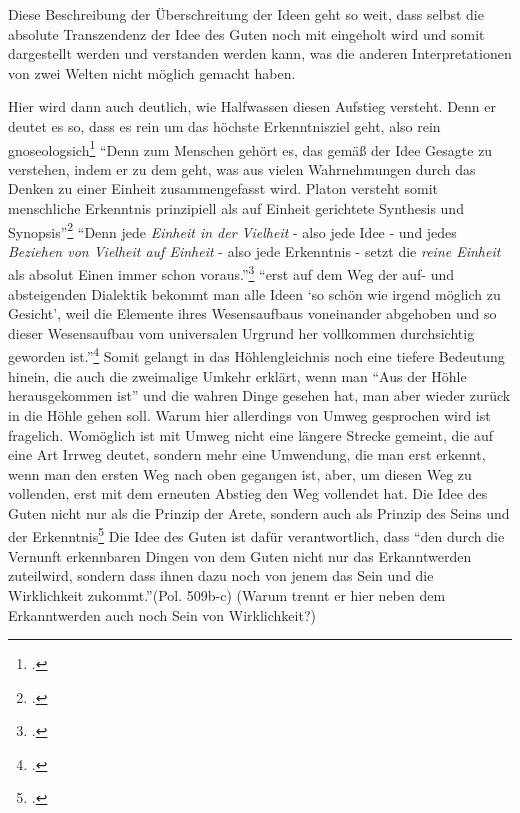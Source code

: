 Diese Beschreibung der Überschreitung der Ideen geht so weit, dass selbst die absolute Transzendenz der Idee des Guten noch mit eingeholt wird und somit dargestellt werden und verstanden werden kann, was die anderen Interpretationen von zwei Welten nicht möglich gemacht haben.

Hier wird dann auch deutlich, wie Halfwassen diesen Aufstieg versteht. Denn er deutet es so, dass es rein um das höchste Erkenntnisziel geht, also rein gnoseologsich\footcite[vgl.][S. 226]{halfwassenaufstieg2006}
\enquote{Denn zum Menschen gehört es, das gemäß der Idee Gesagte zu verstehen, indem er zu dem geht, was aus vielen Wahrnehmungen durch das Denken zu einer Einheit zusammengefasst wird. Platon versteht somit menschliche Erkenntnis prinzipiell als auf Einheit gerichtete Synthesis und Synopsis}\footcite[][S. 228]{halfwassenaufstieg2006}
\enquote{Denn jede \emph{Einheit in der Vielheit} - also jede Idee - und jedes \emph{Beziehen von Vielheit auf Einheit} - also jede Erkenntnis - setzt die \emph{reine Einheit} als absolut Einen immer schon voraus.}\footcite[][S. 230]{halfwassenaufstieg2006}
\enquote{erst auf dem Weg der auf- und absteigenden Dialektik bekommt man alle Ideen \enquote{so schön wie irgend möglich zu Gesicht}, weil die Elemente ihres Wesensaufbaus voneinander abgehoben und so dieser Wesensaufbau vom universalen Urgrund her vollkommen durchsichtig geworden ist.}\footcite[][S. 231]{halfwassenaufstieg2006}
Somit gelangt in das Höhlengleichnis noch eine tiefere Bedeutung hinein, die auch die zweimalige Umkehr erklärt, wenn man \enquote{Aus der Höhle herausgekommen ist} und die wahren Dinge gesehen hat, man aber wieder zurück in die Höhle gehen soll. Warum hier allerdings von Umweg gesprochen wird ist fragelich. Womöglich ist mit Umweg nicht eine längere Strecke gemeint, die auf eine Art Irrweg deutet, sondern mehr eine Umwendung, die man erst erkennt, wenn man den ersten Weg nach oben gegangen ist, aber, um diesen Weg zu vollenden, erst mit dem erneuten Abstieg den Weg vollendet hat. 
Die Idee des Guten nicht nur als die Prinzip der Arete, sondern auch als Prinzip des Seins und der Erkenntnis\footcite[vgl.][S. 238]{halfwassenaufstieg2006}
Die Idee des Guten ist dafür verantwortlich, dass \enquote{den durch die Vernunft erkennbaren Dingen von dem Guten nicht nur das Erkanntwerden zuteilwird, sondern dass ihnen dazu noch von jenem das Sein und die Wirklichkeit zukommt.}(Pol. 509b-c) (Warum trennt er hier neben dem Erkanntwerden auch noch Sein von Wirklichkeit?)

